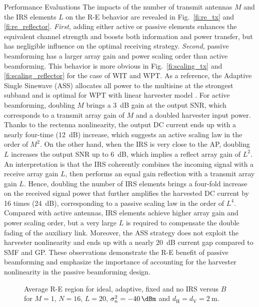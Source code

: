 \documentclass[journal]{IEEEtran}
\begin{document}
\begin{section}{Performance Evaluations}
		The impacts of the number of transmit antennas $M$ and the IRS elements $L$ on the R-E behavior are revealed in Fig.~\ref{fi:re_tx} and \ref{fi:re_reflector}. \emph{First,} adding either active or passive elements enhances the equivalent channel strength and boosts both information and power transfer, but has negligible influence on the optimal receiving strategy. \emph{Second,} passive beamforming has a larger array gain and power scaling order than active beamforming. This behavior is more obvious in Fig.~\ref{fi:scaling_tx} and \ref{fi:scaling_reflector} for the case of WIT and WPT. As a reference, the Adaptive Single Sinewave (ASS) allocates all power to the multisine at the strongest subband and is optimal for WPT with linear harvester model \cite{Clerckx2016a}. For active beamforming, doubling $M$ brings a \SI{3}{\dB} gain at the output SNR, which corresponds to a transmit array gain of $M$ and a doubled harvester input power. Thanks to the rectenna nonlinearity, the output DC current ends up with a nearly four-time (\SI{12}{\dB}) increase, which suggests an active scaling law in the order of $M^2$. On the other hand, when the IRS is very close to the AP, doubling $L$ increases the output SNR up to \SI{6}{\dB}, which implies a reflect array gain of $L^2$. An interpretation is that the IRS coherently combines the incoming signal with a receive array gain $L$, then performs an equal gain reflection with a transmit array gain $L$. Hence, doubling the number of IRS elements brings a four-fold increase on the received signal power that further amplifies the harvested DC current by \num{16} times (\SI{24}{\dB}), corresponding to a passive scaling law in the order of $L^4$. Compared with active antennas, IRS elements achieve higher array gain and power scaling order, but a very large $L$ is required to compensate the double fading of the auxiliary link. Moreover, the ASS strategy does not exploit the harvester nonlinearity and ends up with a nearly \SI{20}{\dB} current gap compared to SMF and GP. These observations demonstrate the R-E benefit of passive beamforming and emphasize the importance of accounting for the harvester nonlinearity in the passive beamforming design.

		\begin{figure}[!t]
			\centering
			\subfloat[$B=\SI{1}{\MHz}$\label{fi:re_irs_1mhz}]{
				\resizebox{0.45\columnwidth}{!}{
					
				}
			}
			\subfloat[$B=\SI{10}{\MHz}$\label{fi:re_irs_10mhz}]{
				\resizebox{0.45\columnwidth}{!}{
					
				}
			}
			\caption{Average R-E region for ideal, adaptive, fixed and no IRS versus $B$ for $M=1$, $N=16$, $L=20$, $\sigma_n^2=\SI{-40}{\dBm}$ and $d_{\mathrm{H}}=d_{\mathrm{V}}=\SI{2}{\meter}$.}
		\end{figure}


\end{section}
\end{document}
